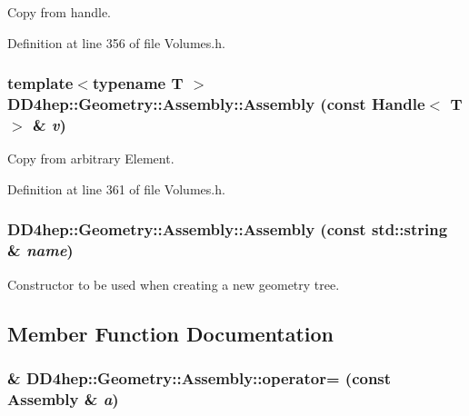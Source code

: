 Copy from handle. 

Definition at line 356 of file Volumes.h.\hypertarget{class_d_d4hep_1_1_geometry_1_1_assembly_a64239140e1f478d5a549b35cc9eb54df}{
\subsubsection[{Assembly}]{\setlength{\rightskip}{0pt plus 5cm}template$<$typename T $>$ DD4hep::Geometry::Assembly::Assembly (const {\bf Handle}$<$ {\bf T} $>$ \& {\em v})}}
\label{class_d_d4hep_1_1_geometry_1_1_assembly_a64239140e1f478d5a549b35cc9eb54df}


Copy from arbitrary Element. 

Definition at line 361 of file Volumes.h.\hypertarget{class_d_d4hep_1_1_geometry_1_1_assembly_a6fd0a7388bc3477c3de4befc6c2cafa4}{
\subsubsection[{Assembly}]{\setlength{\rightskip}{0pt plus 5cm}DD4hep::Geometry::Assembly::Assembly (const std::string \& {\em name})}}
\label{class_d_d4hep_1_1_geometry_1_1_assembly_a6fd0a7388bc3477c3de4befc6c2cafa4}


Constructor to be used when creating a new geometry tree. 

\subsection{Member Function Documentation}
\hypertarget{class_d_d4hep_1_1_geometry_1_1_assembly_a49d6772ff3ef1ed2a49a27ce35caaaac}{
\subsubsection[{operator=}]{\& DD4hep::Geometry::Assembly::operator= (const {\bf Assembly} \& {\em a})}}
\label{class_d_d4hep_1_1_geometry_1_1_assembly_a49d6772ff3ef1ed2a49a27ce35caaaac}


